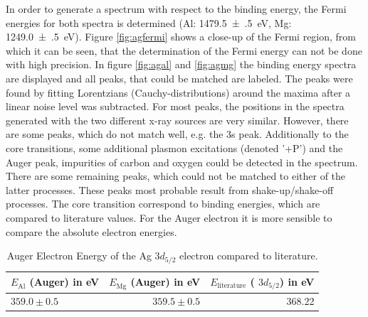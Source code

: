 \documentclass[a4paper]{scrartcl}
\numberwithin{equation}{section}
\numberwithin{figure}{section}
\numberwithin{table}{section}
\begin{document}
In order to generate a spectrum with respect to the binding energy, the Fermi energies for both spectra is determined (Al: \SI{1479.5(5)}{eV}, Mg: \SI{1249.0(5)}{eV}). Figure \ref{fig:agfermi} shows a close-up of the Fermi region, from which it can be seen, that the determination of the Fermi energy can not be done with high precision. In figure \ref{fig:agal} and \ref{fig:agmg} the binding energy spectra are displayed and all peaks, that could be matched are labeled. The peaks were found by fitting Lorentzians (Cauchy-distributions) around the maxima after a linear noise level was subtracted. For most peaks, the positions in the spectra generated with the two different x-ray sources are very similar. However, there are some peaks, which do not match well, e.g. the 3s peak. Additionally to the core transitions, some additional plasmon excitations (denoted '+P') and the Auger peak, impurities of carbon and oxygen could be detected in the spectrum. There are some remaining peaks, which could not be matched to either of the latter processes. These peaks most probable result from shake-up/shake-off processes.
The core transition correspond to binding energies, which are compared to literature values. For the Auger electron it is more sensible to compare the absolute electron energies.
\begin{table}
\centering
\begin{tabular}{lrr}
\toprule
$E_\text{Al}$ (Auger) in eV & $E_\text{Mg}$ (Auger) in eV  & $E_\text{literature}$ ( $3d_{5/2}$) in eV  \\
\midrule
 $359.0 \pm 0.5$ &$ 359.5 \pm 0.5$ & 368.22 \\
 \bottomrule
 \end{tabular}
 \caption{ \small Auger Electron Energy of the Ag $3d_{5/2}$ electron compared to literature.\cite{augerpaper}}
 \label{tab:auger}
 \end{table}
 
 
\FloatBarrier
\end{document}
